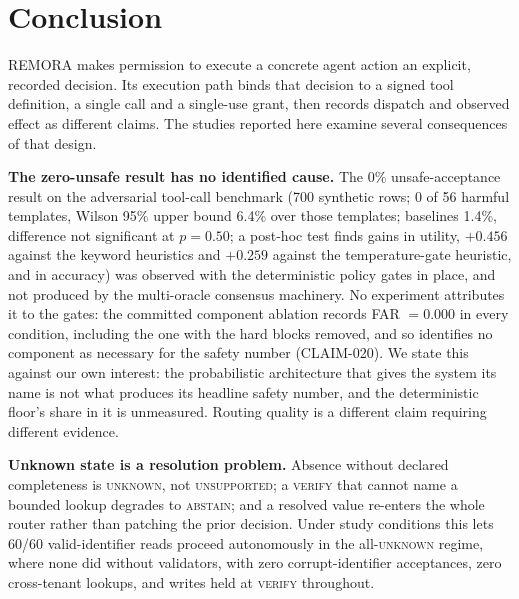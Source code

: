 \documentclass[10pt,twocolumn]{article}
\begin{document}


\section{Conclusion}
\label{sec:conclusion}

REMORA makes permission to execute a concrete agent action an explicit,
recorded decision. Its execution path binds that decision to a signed
tool definition, a single call and a single-use grant, then records
dispatch and observed effect as different claims. The studies reported
here examine several consequences of that design.

\textbf{The zero-unsafe result has no identified cause.} The
0\% unsafe-acceptance result on the adversarial tool-call benchmark (700
synthetic rows; 0 of 56 harmful templates, Wilson 95\% upper bound 6.4\%
over those templates; baselines 1.4\%, difference not significant at
$p=0.50$; a post-hoc test finds gains in utility, $+0.456$ against the
keyword heuristics and $+0.259$ against the temperature-gate heuristic,
and in accuracy) was observed with the deterministic policy gates in place, and
not produced by the multi-oracle consensus machinery. No experiment
attributes it to the gates: the committed component ablation records FAR
$=0.000$ in every condition,
including the one with the hard blocks removed, and so identifies no
component as necessary for the safety number (CLAIM-020). We state this against our
own interest: the probabilistic architecture that gives the system its
name is not what produces its headline safety number, and the
deterministic floor's share in it is unmeasured. Routing quality is a
different claim requiring different evidence.

\textbf{Unknown state is a resolution problem.} Absence without declared
completeness is \textsc{unknown}, not \textsc{unsupported}; a
\textsc{verify} that cannot name a bounded lookup degrades to
\textsc{abstain}; and a resolved value re-enters the whole router rather
than patching the prior decision. Under study conditions this lets 60/60
valid-identifier reads proceed autonomously in the all-\textsc{unknown}
regime, where none did without validators, with
zero corrupt-identifier acceptances, zero cross-tenant lookups, and
writes held at \textsc{verify} throughout.
\end{document}
